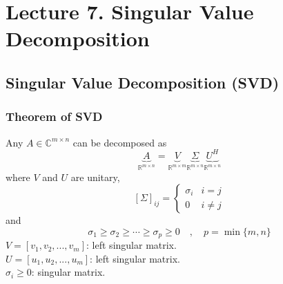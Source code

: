 \section{Lecture 7. Singular Value Decomposition}
\setcounter{theorem}{0}
\begin{multicols}{2}
\subsection{Singular Value Decomposition (SVD)}
\subsubsection{Theorem of SVD}
\begin{theorem}
    Any $A\in \mathbb{C}^{m\times n}$ can be decomposed as
    \[
        \underbrace{A}_{\mathbb{R}^{m\times n}} = \underbrace{V}_{\mathbb{R}^{m\times m}} \underbrace{\Sigma}_{\mathbb{R}^{m\times n}} \underbrace{U^H}_{\mathbb{R}^{m\times n}}
    \]
    where $V$ and $U$ are unitary, 
    \[
        [\Sigma]_{ij} = \left\{
        \begin{array}{ll}
            \sigma_i & i=j \\
            0 & i\neq j
        \end{array}\right.
    \]
    and 
    \[
        \sigma_1 \geq \sigma_2 \geq \cdots \geq \sigma_p \geq 0\quad , \quad p=\min\{m,n\}
    \]
    $V=[v_1,v_2,...,v_m]$: left singular matrix. \\
    $U=[u_1,u_2,...,u_m]$: left singular matrix. \\
    $\sigma_i\geq 0$: singular matrix. 


\end{theorem}
\end{multicols}
